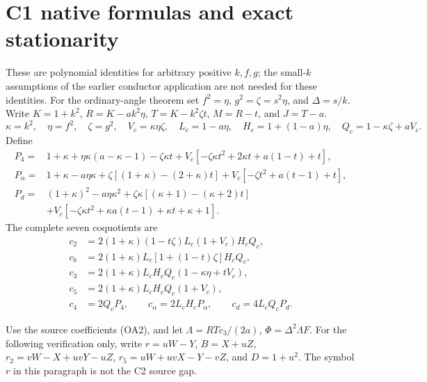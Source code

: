 \section{C1 native formulas and exact stationarity}
\label{app:c1-native}
These are polynomial identities for arbitrary positive $k,f,g$;
the small-$k$ assumptions of the earlier conductor application are not
needed for these identities. For the ordinary-angle theorem set
$f^2=\eta$, $g^2=\zeta=s^2\eta$, and $\Delta=s/k$.
Write $K=1+k^2$, $R=K-ak^2\eta$, $T=K-k^2\zeta t$,
$M=R-t$, and $J=T-a$.
\[
 \kappa=k^2,\quad \eta=f^2,\quad \zeta=g^2,
 \quad V_c=\kappa\eta\zeta,\quad
 L_c=1-a\eta,\quad H_c=1+(1-a)\eta,\quad Q_c=1-\kappa\zeta+aV_c.
\]
Define
\begin{align*}
P_4={}&1+\kappa+\eta\kappa(a-\kappa-1)-\zeta\kappa t
 +V_c[-\zeta\kappa t^2+2\kappa t+a(1-t)+t],\\
P_\alpha={}&1+\kappa-a\eta\kappa
 +\zeta[(1+\kappa)-(2+\kappa)t]
 +V_c[-\zeta t^2+a(t-1)+t],\\
P_d={}&(1+\kappa)^2-a\eta\kappa^2
 +\zeta\kappa[(\kappa+1)-(\kappa+2)t]\\
 &+V_c[-\zeta\kappa t^2+\kappa a(t-1)+\kappa t+\kappa+1].
\end{align*}
The complete seven coquotients are
\begin{align*}
c_2&=2(1+\kappa)(1-t\zeta)L_c(1+V_c)H_cQ_c,\\
c_b&=2(1+\kappa)L_c[1+(1-t)\zeta]H_cQ_c,\\
c_3&=2(1+\kappa)L_cH_cQ_c(1-\kappa\eta+tV_c),\\
c_5&=2(1+\kappa)L_cH_cQ_c(1+V_c),\\
c_4&=2Q_cP_4,\qquad c_\alpha=2L_cH_cP_\alpha,
 \qquad c_d=4L_cQ_cP_d.
\end{align*}

Use the source coefficients (OA2), and let
$\Lambda=RTc_3/(2a)$, $\Phi=\Delta^2\Lambda F$.
For the following verification only, write
$r=uW-Y$, $B=X+uZ$, $r_2=vW-X+uvY-uZ$,
$r_5=uW+uvX-Y-vZ$, and $D=1+u^2$.
The symbol $r$ in this paragraph is not the C2 source gap.
